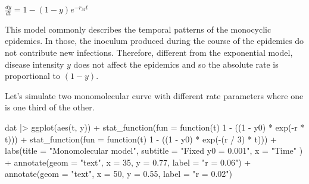 \documentclass[
  letterpaper,
  DIV=11,
  numbers=noendperiod]{scrreprt}
\newenvironment{Shaded}{\begin{snugshade}}{\end{snugshade}}
\newcommand{\AttributeTok}[1]{\textcolor[rgb]{0.40,0.45,0.13}{#1}}
\newcommand{\ControlFlowTok}[1]{\textcolor[rgb]{0.00,0.23,0.31}{#1}}
\newcommand{\DecValTok}[1]{\textcolor[rgb]{0.68,0.00,0.00}{#1}}
\newcommand{\FloatTok}[1]{\textcolor[rgb]{0.68,0.00,0.00}{#1}}
\newcommand{\FunctionTok}[1]{\textcolor[rgb]{0.28,0.35,0.67}{#1}}
\newcommand{\NormalTok}[1]{\textcolor[rgb]{0.00,0.23,0.31}{#1}}
\newcommand{\SpecialCharTok}[1]{\textcolor[rgb]{0.37,0.37,0.37}{#1}}
\newcommand{\StringTok}[1]{\textcolor[rgb]{0.13,0.47,0.30}{#1}}
\begin{document}
\(\frac{dy}{dt} = 1 - (1-y)e^{-r_Mt}\)

This model commonly describes the temporal patterns of the monocyclic
epidemics. In those, the inoculum produced during the course of the
epidemics do not contribute new infections. Therefore, different from
the exponential model, disease intensity \(y\) does not affect the
epidemics and so the absolute rate is proportional to \((1-y)\).

Let's simulate two monomolecular curve with different rate parameters
where one is one third of the other.

\begin{Shaded}
\begin{Highlighting}[]
\NormalTok{dat }\SpecialCharTok{|\textgreater{}}
  \FunctionTok{ggplot}\NormalTok{(}\FunctionTok{aes}\NormalTok{(t, y)) }\SpecialCharTok{+}
  \FunctionTok{stat\_function}\NormalTok{(}\AttributeTok{fun =} \ControlFlowTok{function}\NormalTok{(t) }\DecValTok{1} \SpecialCharTok{{-}}\NormalTok{ ((}\DecValTok{1} \SpecialCharTok{{-}}\NormalTok{ y0) }\SpecialCharTok{*} \FunctionTok{exp}\NormalTok{(}\SpecialCharTok{{-}}\NormalTok{r }\SpecialCharTok{*}\NormalTok{ t))) }\SpecialCharTok{+}
  \FunctionTok{stat\_function}\NormalTok{(}\AttributeTok{fun =} \ControlFlowTok{function}\NormalTok{(t) }\DecValTok{1} \SpecialCharTok{{-}}\NormalTok{ ((}\DecValTok{1} \SpecialCharTok{{-}}\NormalTok{ y0) }\SpecialCharTok{*} \FunctionTok{exp}\NormalTok{(}\SpecialCharTok{{-}}\NormalTok{(r }\SpecialCharTok{/} \DecValTok{3}\NormalTok{) }\SpecialCharTok{*}\NormalTok{ t))) }\SpecialCharTok{+}
  \FunctionTok{labs}\NormalTok{(}\AttributeTok{title =} \StringTok{"Monomolecular model"}\NormalTok{,}
         \AttributeTok{subtitle =} \StringTok{"Fixed y0 = 0.001"}\NormalTok{, }\AttributeTok{x =} \StringTok{"Time"}
\NormalTok{       ) }\SpecialCharTok{+}
  \FunctionTok{annotate}\NormalTok{(}\AttributeTok{geom =} \StringTok{"text"}\NormalTok{, }\AttributeTok{x =} \DecValTok{35}\NormalTok{, }\AttributeTok{y =} \FloatTok{0.77}\NormalTok{, }\AttributeTok{label =} \StringTok{"r = 0.06"}\NormalTok{) }\SpecialCharTok{+}
  \FunctionTok{annotate}\NormalTok{(}\AttributeTok{geom =} \StringTok{"text"}\NormalTok{, }\AttributeTok{x =} \DecValTok{50}\NormalTok{, }\AttributeTok{y =} \FloatTok{0.55}\NormalTok{, }\AttributeTok{label =} \StringTok{"r = 0.02"}\NormalTok{)}
\end{Highlighting}
\end{Shaded}
\end{document}
